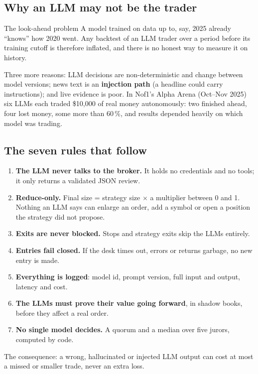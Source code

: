 \documentclass[11pt,a4paper]{article}
\begin{document}
\subsection{Why an LLM may not be the trader}
\begin{callout}[bad]{The look-ahead problem}
A model trained on data up to, say, 2025 already ``knows'' how 2020 went. Any backtest of an LLM trader over a period before
its training cutoff is therefore inflated, and there is no honest way to measure it on history.
\end{callout}
Three more reasons: LLM decisions are non-deterministic and change between model versions; news text is an
\textbf{injection path} (a headline could carry instructions); and live evidence is poor. In Nof1's Alpha Arena
(Oct--Nov 2025) six LLMs each traded \$10,000 of real money autonomously: two finished ahead, four lost money, some more
than 60\,\%, and results depended heavily on which model was trading.

\subsection{The seven rules that follow}
\begin{enumerate}
  \item \textbf{The LLM never talks to the broker.} It holds no credentials and no tools; it only returns a validated JSON review.
  \item \textbf{Reduce-only.} Final size = strategy size $\times$ a multiplier between 0 and 1. Nothing an LLM says can enlarge an
        order, add a symbol or open a position the strategy did not propose.
  \item \textbf{Exits are never blocked.} Stops and strategy exits skip the LLMs entirely.
  \item \textbf{Entries fail closed.} If the desk times out, errors or returns garbage, no new entry is made.
  \item \textbf{Everything is logged}: model id, prompt version, full input and output, latency and cost.
  \item \textbf{The LLMs must prove their value going forward}, in shadow books, before they affect a real order.
  \item \textbf{No single model decides.} A quorum and a median over five jurors, computed by code.
\end{enumerate}
The consequence: a wrong, hallucinated or injected LLM output can cost at most a missed or smaller trade, never an extra loss.
\end{document}

